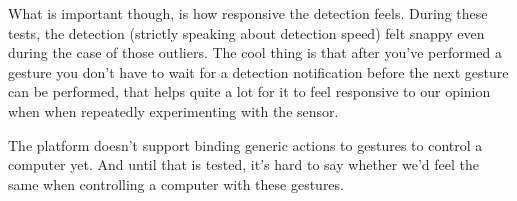 \documentclass[a4paper]{article}
\begin{document}
  What is important though, is how responsive the detection feels. During these
  tests, the detection (strictly speaking about detection speed) felt snappy even
  during the case of those outliers. The cool thing is that after you've
  performed a gesture you don't have to wait for a detection notification before
  the next gesture can be performed, that helps quite a lot for it to feel
  responsive to our opinion when when repeatedly experimenting with the sensor.

  The platform doesn't support binding
  generic actions to gestures to control a computer yet. And until that is
  tested, it's hard to say whether we'd feel the same when controlling a
  computer with these gestures.
\end{document}
